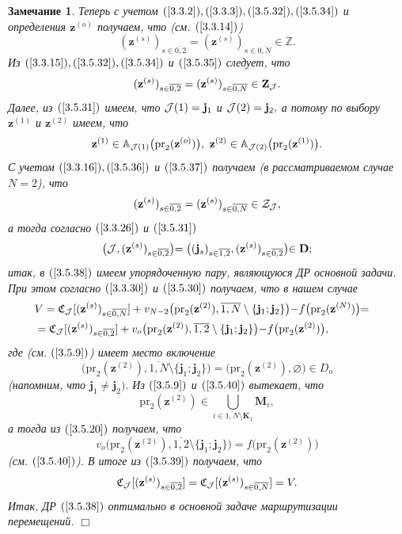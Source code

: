\documentclass[11pt,twoside,openany]{report}
\newcommand{\bfn}{\begin{equation}}
\newcommand{\efn}{\end{equation}}
\newcommand{\ov}{\overline}
\newcounter{theo}
\newcounter{zam}
\newtheorem{zam}{Замечание}[section]
\newcommand{\sm}{\setminus}
\newcommand{\cj}{{\cal J}}
\newcommand{\cz}{{\cal Z}}
\newcommand{\bba}{{\mathbb A}}
\newcommand{\bbz}{{\mathbb Z}}
\newcommand{\emp}{\varnothing}
\begin{document}
{\begin{zam}
Теперь с учетом $(\ref{3.3.2}), (\ref{3.3.3}), (\ref{3.5.32}), (\ref{3.5.34})$ и
определения $\mathbf{z}^{(o)}$ получаем, что (см. $(\ref{3.3.14})$)
\bfn\label{3.5.35}(\mathbf{z}^{(s)})_{s\in\ov{0,2}} =
(\mathbf{z}^{(s)})_{s\in\ov{0,N}}\in \bbz.
\efn
Из $(\ref{3.3.15}), (\ref{3.5.32}), (\ref{3.5.34})$ и $(\ref{3.5.35})$ следует, что
\bfn\label{3.5.36}(\mathbf{z}^{(s)})_{s\in\ov{0,2}} = (\mathbf{z}^{(s)})_{s\in\ov{0,N}}
\in \mathbf{Z}_\cj.
\efn
Далее, из $(\ref{3.5.31})$ имеем, что $\cj(1) = \mathbf{j}_1$ и $\cj(2) = \mathbf{j}_2,$
а потому по выбору $\mathbf{z}^{(1)}$ и $\mathbf{z}^{(2)}$ имеем, что
\bfn\label{3.5.37}\mathbf{z}^{(1)} \in \bba_{\cj(1)} \bigl(\mathrm{pr}_2(\mathbf{z}^{(o)})\bigl),
\ \mathbf{z}^{(2)} \in \bba_{\cj(2)} \bigl(\mathrm{pr}_2(\mathbf{z}^{(1)})\bigl).
\efn
С учетом $(\ref{3.3.16}), (\ref{3.5.36})$ и $(\ref{3.5.37})$ получаем (в рассматриваемом
случае $N = 2$), что
$$
(\mathbf{z}^{(s)})_{s\in\ov{0,2}} = (\mathbf{z}^{(s)})_{s\in\ov{0,N}} \in \cz_\cj,
$$
а тогда согласно $(\ref{3.3.26})$  и $(\ref{3.5.31})$
\bfn\label{3.5.38}\bigl(\cj,(\mathbf{z}^{(s)})_{s\in\ov{0,2}} \bigl) =
\bigl((\mathbf{j}_s)_{s\in\ov{1,2}},(\mathbf{z}^{(s)})_{s\in\ov{0,2}} \bigl) \in \mathbf{D};
\efn
итак, в $(\ref{3.5.38})$ имеем упорядоченную пару, являющуюся ДР основной задачи. При этом
согласно $(\ref{3.3.30})$ и $(\ref{3.5.30})$ получаем, что в нашем случае
\begin{eqnarray}
&V = \mathfrak{C}_\cj[(\mathbf{z}^{(s)})_{s\in\ov{0,N}}] +
v_{N-2}\bigl(\mathrm{pr}_2(\mathbf{z}^{(2)}),\ov{1,N}\sm\{\mathbf{j}_1;\mathbf{j}_2\}\bigl) -
f\bigl(\mathrm{pr}_2(\mathbf{z}^{(N)})\bigl) =
&\nonumber\\
&= \mathfrak{C}_\cj[(\mathbf{z}^{(s)})_{s\in\ov{0,2}}] + v_o\bigl(\mathrm{pr}_2(\mathbf{z}^{(2)}),
\ov{1,2}\sm \{\mathbf{j}_1;\mathbf{j}_2\}\bigl) - f\bigl(\mathrm{pr}_2(\mathbf{z}^{(2)})\bigl),
&\label{3.5.39}
\end{eqnarray}
где (см. $(\ref{3.5.9})$) имеет место включение
\bfn\label{3.5.40}\bigl(\mathrm{pr}_2(\mathbf{z}^{(2)}),\ov{1,N}\sm\{\mathbf{j}_1;\mathbf{j}_2\}\bigl) =
\bigl(\mathrm{pr}_2(\mathbf{z}^{(2)}),\emp\bigl) \in D_o
\efn
(напомним, что $\mathbf{j}_1\neq \mathbf{j}_2).$ Из $(\ref{3.5.9})$ и $(\ref{3.5.40})$ вытекает, что
$$\mathrm{pr}_2(\mathbf{z}^{(2)})\in \bigcup\limits_{i\in\ov{1,N}\sm \mathbf{K}_1}\mathbf{M}_i,$$
а тогда из $(\ref{3.5.20})$ получаем, что
$$
v_o\bigl(\mathrm{pr}_2(\mathbf{z}^{(2)}),\ov{1,2}\sm\{\mathbf{j}_1;\mathbf{j}_2\}\bigl) =
f\bigl(\mathrm{pr}_2(\mathbf{z}^{(2)})\bigl)
$$
(см. $(\ref{3.5.40})$). В итоге из $(\ref{3.5.39})$ получаем, что
\bfn\label{3.5.40`}
\mathfrak{C}_\cj[(\mathbf{z}^{(s)})_{s\in\ov{0,2}}]=
\mathfrak{C}_\cj[(\mathbf{z}^{(s)})_{s\in\ov{0,N}}] = V.
\efn
Итак, ДР $(\ref{3.5.38})$ оптимально в основной задаче маршрутизации перемещений.
\hfill $\Box$ \end{zam}

}
\end{document}
